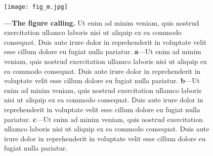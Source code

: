 \begin{figure}[t!] %
\centering
\texttt{[image: fig\_m.jpg]}		
\caption[Caption for display in the LOF]
{
    \textbf{ ---\;The figure calling.}
    Ut enim ad minim veniam, quis nostrud exercitation ullamco laboris nisi ut aliquip ex ea commodo consequat. Duis aute irure dolor in reprehenderit in voluptate velit esse cillum dolore eu fugiat nulla pariatur.
    \;\textbf{a}\;---\;Ut enim ad minim veniam, quis nostrud exercitation ullamco laboris nisi ut aliquip ex ea commodo consequat. Duis aute irure dolor in reprehenderit in voluptate velit esse cillum dolore eu fugiat nulla pariatur.
    \;\textbf{b}\;---\;Ut enim ad minim veniam, quis nostrud exercitation ullamco laboris nisi ut aliquip ex ea commodo consequat. Duis aute irure dolor in reprehenderit in voluptate velit esse cillum dolore eu fugiat nulla pariatur.
    \;\textbf{c}\;---\;Ut enim ad minim veniam, quis nostrud exercitation ullamco laboris nisi ut aliquip ex ea commodo consequat. Duis aute irure dolor in reprehenderit in voluptate velit esse cillum dolore eu fugiat nulla pariatur.
}
\label{fig:label} 		
\end{figure}